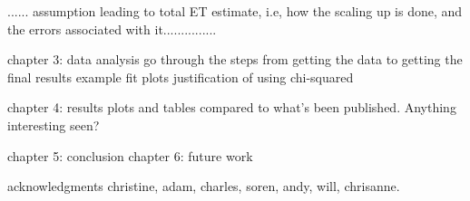 ...... assumption leading to total ET estimate, i.e, how the scaling up is done, and the errors associated with it...............

chapter 3: data analysis
go through the steps from getting the data to getting the final results
example fit plots
justification of using chi-squared

chapter 4: results
plots and tables compared to what's been published.
Anything interesting seen?

chapter 5: conclusion
chapter 6: future work

acknowledgments
christine, adam, charles, soren, andy, will, chrisanne.



